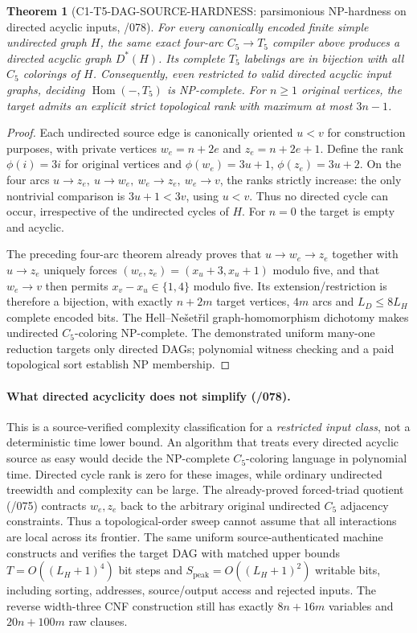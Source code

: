 \documentclass[11pt]{article}
\newtheorem{theorem}{Theorem}
\begin{document}
\begin{theorem}[C1-T5-DAG-SOURCE-HARDNESS: parsimonious NP-hardness on directed acyclic inputs, /078]
For every canonically encoded finite simple undirected graph $H$,
the same exact four-arc $C_5\to T_5$ compiler above produces a
\emph{directed acyclic graph} $D^*(H)$. Its complete
$T_5$ labelings are in bijection with all $C_5$ colorings
of $H$. Consequently, even restricted to valid
directed acyclic input graphs, deciding
$\operatorname{Hom}(-,T_5)$ is NP-complete.
For $n\ge1$ original vertices, the target admits an explicit
strict topological rank with maximum at most $3n-1$.
\end{theorem}
\begin{proof}
Each undirected source edge is canonically oriented $u<v$ for
construction purposes, with private vertices
$w_e=n+2e$ and $z_e=n+2e+1$. Define the rank
$\phi(i)=3i$ for original vertices and
$\phi(w_e)=3u+1$, $\phi(z_e)=3u+2$.
On the four arcs
$u\to z_e,\ u\to w_e,\ w_e\to z_e,\ w_e\to v$,
the ranks strictly increase: the only nontrivial comparison
is $3u+1<3v$, using $u<v$.
Thus no directed cycle can occur, irrespective of the
undirected cycles of $H$. For $n=0$ the target is empty
and acyclic.

The preceding four-arc theorem already proves that
$u\to w_e\to z_e$ together with $u\to z_e$
uniquely forces $(w_e,z_e)=(x_u+3,x_u+1)$
modulo five, and that $w_e\to v$ then permits
$x_v-x_u\in\{1,4\}$ modulo five. Its extension/restriction
is therefore a bijection, with exactly
$n+2m$ target vertices, $4m$ arcs and
$L_D\le8L_H$ complete encoded bits.
The Hell--Ne\v{s}et\v{r}il graph-homomorphism
dichotomy makes undirected $C_5$-coloring NP-complete.
The demonstrated uniform many-one reduction targets
only directed DAGs; polynomial witness checking and
a paid topological sort establish NP membership.
\end{proof}

\paragraph{What directed acyclicity does not simplify (/078).}
This is a source-verified complexity classification for a
\emph{restricted input class}, not a deterministic time lower bound.
An algorithm that treats every directed acyclic source as easy
would decide the NP-complete $C_5$-coloring language in
polynomial time. Directed cycle rank is zero for these images,
while ordinary undirected treewidth and complexity can be large.
The already-proved forced-triad quotient (/075) contracts
$w_e,z_e$ back to the arbitrary original undirected $C_5$
adjacency constraints. Thus a topological-order sweep cannot
assume that all interactions are local across its frontier.
The same uniform source-authenticated machine constructs
and verifies the target DAG with matched upper bounds
$T=O((L_H+1)^4)$ bit steps and
$S_{\mathrm{peak}}=O((L_H+1)^2)$ writable bits, including
sorting, addresses, source/output access and rejected inputs.
The reverse width-three CNF construction still has exactly
$8n+16m$ variables and $20n+100m$ raw clauses.
\end{document}
